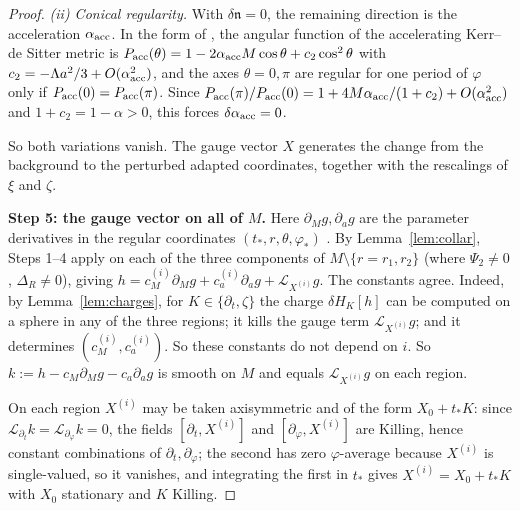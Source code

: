 \documentclass[11pt]{amsart}
\theoremstyle{definition}
\theoremstyle{remark}
\numberwithin{equation}{section}
\newcommand{\cL}{\mathcal{L}}
\begin{document}
\begin{proof}
\emph{(ii) Conical regularity.} With $\delta\mathfrak n=0$, the remaining direction is the acceleration $\alpha_{\rm acc}$. In
the form of \cite{GP06}, the angular function of the accelerating Kerr--de Sitter metric is
$P_{\rm acc}(\theta)=1-2\alpha_{\rm acc}M\cos\theta+c_2\cos^2\theta$ with $c_2=-\Lambda a^2/3+O(\alpha_{\rm acc}^2)$, and the axes
$\theta=0,\pi$ are regular for one period of $\varphi$ only if $P_{\rm acc}(0)=P_{\rm acc}(\pi)$. Since
$P_{\rm acc}(\pi)/P_{\rm acc}(0)=1+4M\alpha_{\rm acc}/(1+c_2)+O(\alpha_{\rm acc}^2)$ and $1+c_2=1-\alpha>0$, this forces $\delta\alpha_{\rm acc}=0$.

So both variations vanish. The gauge vector $X$ generates the change from
the background to the perturbed adapted coordinates, together with the rescalings of $\xi$ and $\zeta$.

\smallskip\noindent\textbf{Step 5: the gauge vector on all of $M$.} Here $\partial_Mg,\partial_ag$ are the parameter derivatives in the
regular coordinates $(t_*,r,\theta,\varphi_*)$ \cite{HPV25}. By Lemma~\ref{lem:collar}, Steps 1--4 apply on each of the
three components of $M\setminus\{r=r_1,r_2\}$ (where $\Psi_2\ne0$, $\Delta_R\ne0$), giving
$h=c_M^{(i)}\partial_Mg+c_a^{(i)}\partial_ag+\cL_{X^{(i)}}g$. The constants agree. Indeed, by Lemma~\ref{lem:charges}, for $K\in\{\partial_t,\zeta\}$ the charge
$\delta H_K[h]$ can be computed on a sphere in any of the three regions; it kills the gauge term $\cL_{X^{(i)}}g$; and it
determines $(c_M^{(i)},c_a^{(i)})$. So these constants do not depend on $i$. So $k:=h-c_M\partial_Mg-c_a\partial_ag$ is smooth on $M$ and equals $\cL_{X^{(i)}}g$ on each region.

On each region $X^{(i)}$ may be taken axisymmetric and of the form $X_0+t_*K$: since $\cL_{\partial_t}k=\cL_{\partial_\varphi}k=0$,
the fields $[\partial_t,X^{(i)}]$ and $[\partial_\varphi,X^{(i)}]$ are Killing, hence constant combinations of $\partial_t,\partial_\varphi$;
the second has zero $\varphi$-average because $X^{(i)}$ is single-valued, so it vanishes, and integrating the first in
$t_*$ gives $X^{(i)}=X_0+t_*K$ with $X_0$ stationary and $K$ Killing.


\end{proof}
\end{document}

